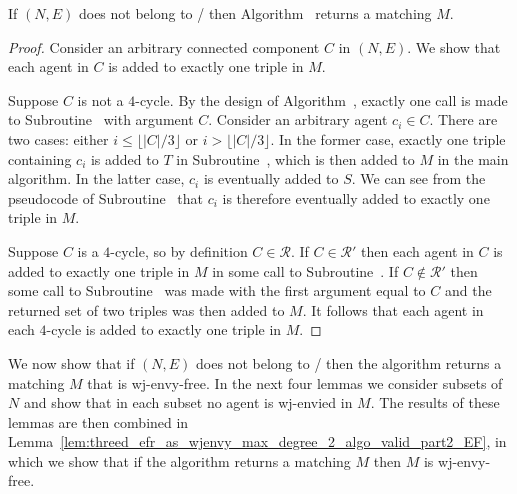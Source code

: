 \begin{lem}
\label{lem:threed_efr_as_wjenvy_max_degree_2_algo_valid_part1pointfive_pit}
If $(N, E)$ does not belong to \iwjnomaxdegreetwofamily/ then Algorithm~ returns a matching $M$.
\end{lem}
\begin{proof}
Consider an arbitrary connected component $C$ in $(N, E)$. We show that each agent in $C$ is added to exactly one triple in $M$. 

Suppose $C$ is not a $4$-cycle. By the design of Algorithm~, exactly one call is made to Subroutine~ with argument $C$. Consider an arbitrary agent $c_i \in C$. There are two cases: either $i \leq \lfloor |C|/3 \rfloor$ or $i > \lfloor |C|/3 \rfloor$. In the former case, exactly one triple containing $c_i$ is added to $T$ in Subroutine~, which is then added to $M$ in the main algorithm. In the latter case, $c_i$ is eventually added to $S$. We can see from the pseudocode of Subroutine~ that $c_i$ is therefore eventually added to exactly one triple in $M$.

Suppose $C$ is a $4$-cycle, so by definition $C \in \mathcal{R}$. If $C \in \mathcal{R}'$ then each agent in $C$ is added to exactly one triple in $M$ in some call to Subroutine~. If $C \notin \mathcal{R}'$ then some call to Subroutine~ was made with the first argument equal to $C$ and the returned set of two triples was then added to $M$. It follows that each agent in each $4$-cycle is added to exactly one triple in $M$.
\end{proof} 

We now show that if $(N, E)$ does not belong to \iwjnomaxdegreetwofamily/ then the algorithm returns a matching $M$ that is wj-envy-free. In the next four lemmas we consider subsets of $N$ and show that in each subset no agent is wj-envied in $M$. The results of these lemmas are then combined in Lemma~\ref{lem:threed_efr_as_wjenvy_max_degree_2_algo_valid_part2_EF}, in which we show that if the algorithm returns a matching $M$ then $M$ is wj-envy-free.

